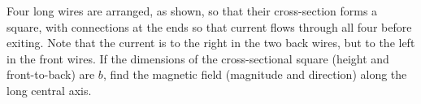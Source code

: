 Four long wires are arranged, as shown, so that their
        cross-section forms a square, with connections at the ends
        so that current flows through all four before exiting.
        Note that the current is to the right in the two back wires,
        but to the left in the front wires. If the dimensions of the
        cross-sectional square (height and front-to-back) are $b$,
        find the magnetic field (magnitude and direction) along
        the long central axis.\answercheck
